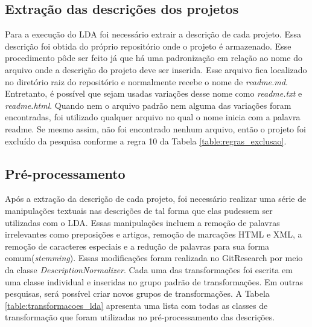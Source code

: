 \subsection{Extração das descrições dos projetos}

Para a execução do LDA foi necessário extrair a descrição de cada projeto. Essa descrição foi obtida do próprio repositório onde o projeto é armazenado. Esse procedimento pôde ser feito já que há uma padronização em relação ao nome do arquivo onde a descrição do projeto deve ser inserida. Esse arquivo fica localizado no diretório raiz do repositório e normalmente recebe o nome de \textit{readme.md}. Entretanto, é possível que sejam usadas variações desse nome como \textit{readme.txt} e \textit{readme.html}. Quando nem  o arquivo padrão nem  alguma das variações foram encontradas, foi utilizado qualquer arquivo no qual o nome inicia com a palavra readme. Se mesmo assim, não foi encontrado nenhum arquivo, então o projeto foi excluído da pesquisa conforme a regra 10 da Tabela \ref{table:regras_exclusao}.

\subsection{Pré-processamento}

Após a extração da descrição de cada projeto, foi necessário realizar uma série de manipulações textuais nas descrições de tal  forma que  elas pudessem ser utilizadas com o LDA. Essas manipulações incluem a remoção de palavras irrelevantes como preposições e artigos, remoção de marcações HTML e XML, a remoção de caracteres especiais e a redução de palavras para sua forma comum(\textit{stemming}\cite{jivani2011comparative}).  Essas modificações foram realizada no GitResearch por meio da classe \textit{DescriptionNormalizer}. Cada uma das transformações foi escrita em uma classe individual e inseridas no grupo padrão de transformações. Em outras pesquisas, será possível criar novos grupos de transformações.  A Tabela \ref{table:transformacoes_lda} apresenta uma lista com todas as classes de transformação que foram utilizadas no pré-processamento das descrições.


